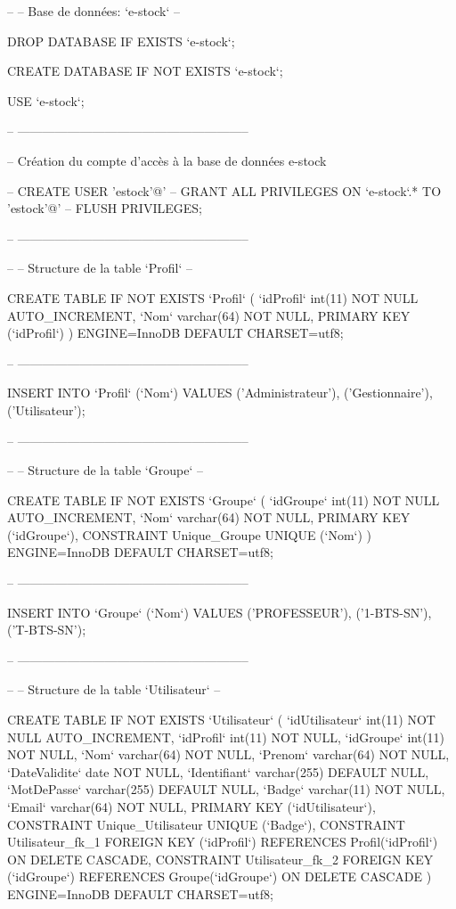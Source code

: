 \begin{DoxyCode}
--
-- Base de données: `e-stock`
--

DROP DATABASE IF EXISTS `e-stock`;

CREATE DATABASE IF NOT EXISTS `e-stock`;

USE `e-stock`;

-- --------------------------------------------------------

-- Création du compte d'accès à la base de données e-stock

-- CREATE USER 'estock'@'%
-- GRANT ALL PRIVILEGES ON `e-stock`.* TO 'estock'@'%
-- FLUSH PRIVILEGES;

-- --------------------------------------------------------

--
-- Structure de la table `Profil`
--

CREATE TABLE IF NOT EXISTS `Profil` (
  `idProfil` int(11) NOT NULL AUTO\_INCREMENT,
  `Nom` varchar(64) NOT NULL,
  PRIMARY KEY (`idProfil`)
) ENGINE=InnoDB DEFAULT CHARSET=utf8;

-- --------------------------------------------------------

INSERT INTO `Profil` (`Nom`) VALUES
('Administrateur'),
('Gestionnaire'),
('Utilisateur');

-- --------------------------------------------------------

--
-- Structure de la table `Groupe`
--

CREATE TABLE IF NOT EXISTS `Groupe` (
  `idGroupe` int(11) NOT NULL AUTO\_INCREMENT,
  `Nom` varchar(64) NOT NULL,
  PRIMARY KEY (`idGroupe`),
  CONSTRAINT Unique\_Groupe UNIQUE (`Nom`)
) ENGINE=InnoDB DEFAULT CHARSET=utf8;

-- --------------------------------------------------------

INSERT INTO `Groupe` (`Nom`) VALUES
('PROFESSEUR'),
('1-BTS-SN'),
('T-BTS-SN');

-- --------------------------------------------------------

--
-- Structure de la table `Utilisateur`
--

CREATE TABLE IF NOT EXISTS `Utilisateur` (
  `idUtilisateur` int(11) NOT NULL AUTO\_INCREMENT,
  `idProfil` int(11) NOT NULL,
  `idGroupe` int(11) NOT NULL,
  `Nom` varchar(64) NOT NULL,
  `Prenom` varchar(64) NOT NULL,
  `DateValidite` date NOT NULL,
  `Identifiant` varchar(255) DEFAULT NULL,
  `MotDePasse` varchar(255) DEFAULT NULL,
  `Badge` varchar(11) NOT NULL,
  `Email` varchar(64) NOT NULL,  
  PRIMARY KEY (`idUtilisateur`),
  CONSTRAINT Unique\_Utilisateur UNIQUE (`Badge`),
  CONSTRAINT Utilisateur\_fk\_1 FOREIGN KEY (`idProfil`) REFERENCES Profil(`idProfil`) ON DELETE CASCADE,
  CONSTRAINT Utilisateur\_fk\_2 FOREIGN KEY (`idGroupe`) REFERENCES Groupe(`idGroupe`) ON DELETE CASCADE
) ENGINE=InnoDB DEFAULT CHARSET=utf8;


\end{DoxyCode}
